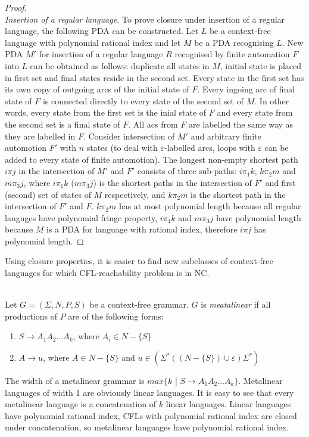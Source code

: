 \begin{proof}
\\
\textit{Insertion of a regular language.} To prove closure under insertion of a regular language, the following PDA can be constructed. Let $L$ be a context-free language with polynomial rational index and let $M$ be a PDA recognising $L$. New PDA $M'$ for insertion of a regular language $R$ recognised by finite automation $F$ into $L$ can be obtained as follows: duplicate all states in $M$, initial state is placed in first set and final states reside in the second set. Every state in the first set has its own copy of outgoing arcs of the initial state of $F$. Every ingoing arc of final state of $F$ is connected directly to every state of the second set of $M$. In other words, every state from the first set is the inial state of $F$ and every state from the second set is a final state of $F$. All acs from $F$ are labelled the same way as they are labelled in $F$.
Consider intersection of $M'$ and arbitrary finite automotion $F'$ with $n$ states (to deal with $\varepsilon$-labelled arcs, loops with $\varepsilon$ can be added to every state of finite automotion). The longest non-empty shortest path $i \pi j$ in the intersection of $M'$ and $F'$ consists of three sub-paths: $i\pi_1k$, $k\pi_2m$ and $m\pi_3j$, where $i\pi_1k$ ($m\pi_3j$) is the shortest paths in the intersection of $F'$ and first (second) set of states of $M$ respectively, and $k\pi_2m$ is the shortest path in the intersection of $F'$ and $F$. $k\pi_2m$ has at most polynomial length because all regular languges have polynomial fringe property, $i\pi_1k$ and $m\pi_3j$ have polynomial length because $M$ is a PDA for language with rational index, therefore  $i \pi j$ has polynomial length.
\end{proof}


Using closure properties, it is easier to find new subclasses of context-free languages for which CFL-reachability problem is in NC.
\begin{example}
\\
Let $G = (\Sigma, N, P, S)$ be a context-free grammar. $G$ is \textit{meatalinear} if all productions of $P$ are of the following forms:
\begin{enumerate}
\item $S \rightarrow A_1A_2...A_k$, where $A_i \in N - \{S\}$
\item $A \rightarrow u$, where $A \in N - \{S\}$ and $u \in (\Sigma^*((N-\{S\}) \cup {\varepsilon})\Sigma^*)$
\end{enumerate}


The width of a metalinear grammar is $max\{k$ | $S \rightarrow A_1A_2...A_k \}$. Metalinear languages of width 1 are obviously linear languages. It is easy to see that every metalinear language is a concatenation of $k$ linear languages. Linear languages have polynomial rational index,  CFLs with polynomial rational index are closed under concatenation, so metalinear languages have polynomial rational index.
\end{example}

